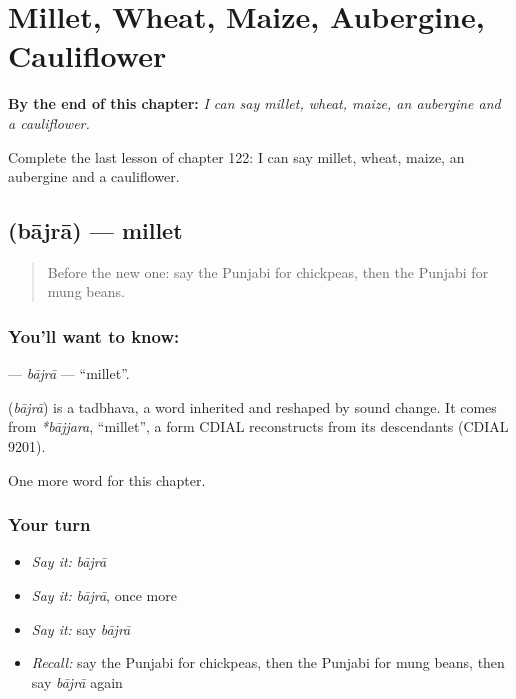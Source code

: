
\chapter{Millet, Wheat, Maize, Aubergine, Cauliflower}
\label{ch:pa-millet-wheat-maize-aubergine-cauliflower}

\begin{chapteropening}
\textbf{By the end of this chapter:} \emph{I can say millet, wheat, maize, an aubergine and a cauliflower.}

Complete the last lesson of chapter 122: I can say millet, wheat, maize, an aubergine and a cauliflower.
\end{chapteropening}

\section[\texorpdfstring{\pa{ਬਾਜਰਾ} (bājrā)}{ਬਾਜਰਾ (bājrā)}]{ (bājrā) — millet}

\label{lesson:PA-C122-bajra}



\begin{quote}
Before the new one: say the Punjabi for chickpeas, then the Punjabi for mung beans.
\end{quote}

\subsection*{You'll want to know: }
\textbf{} — \emph{bājrā} — \textquotedblleft{}millet\textquotedblright{}.

\begin{cousinweb}
\textbf{} (\emph{bājrā}) is a tadbhava, a word inherited and reshaped by sound change. It comes from \emph{*bājjara}, \textquotedblleft{}millet\textquotedblright{}, a form CDIAL reconstructs from its descendants (CDIAL 9201).
\end{cousinweb}

\begin{grammarlens}[title={What you've built}]
One more word for this chapter.
\end{grammarlens}

\subsection*{Your turn}
\begin{itemize}
\raggedright
  \item \emph{Say it:} \emph{bājrā}
  \item \emph{Say it:} \emph{bājrā}, once more
  \item \emph{Say it:} say \emph{bājrā}
  \item \emph{Recall:} say the Punjabi for chickpeas, then the Punjabi for mung beans, then say \emph{bājrā} again
\end{itemize}

